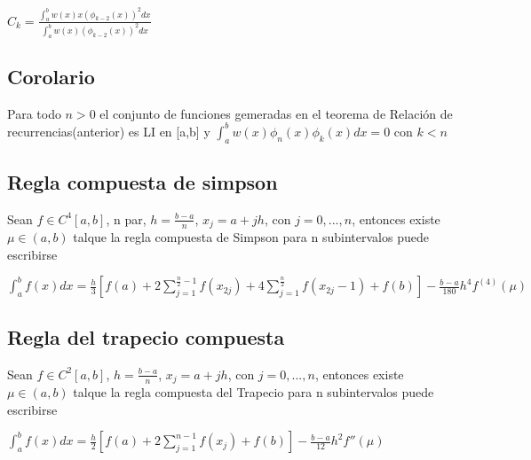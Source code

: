 \documentclass{article}
\begin{document}
$C_k = \frac{\displaystyle\int_{a}^{b}w(x)x(\phi_{k-2}(x))^2dx}{\displaystyle\int_{a}^{b}w(x)(\phi_{k-2}(x))^2dx}$


 \vspace{5mm}


 \subsection{Corolario}\label{Metodo-Newton-Global}

Para todo $n > 0$ el conjunto de funciones gemeradas en el teorema de Relación de recurrencias(anterior) es LI en [a,b]
y $\displaystyle\int_{a}^{b}w(x)\phi_n(x)\phi_k(x)dx = 0$ con $k < n$


 \vspace{5mm}

\subsection{Regla compuesta de simpson}\label{Simpson}

Sean $f \in C^4[a,b]$, n par, $h = \frac{b-a}{n}$, $x_j = a+jh$, con $j=0,...,n$, entonces existe $\mu \in (a,b)$
talque la regla compuesta de Simpson para n subintervalos puede escribirse

 \vspace{5mm}

 $\displaystyle\int_{a}^{b}f(x)dx = \frac{h}{3} \left[ f(a) + 2 \sum\limits_{j=1}^{\frac{n}{2}-1}f(x_{2j})
 +4\sum\limits_{j=1}^{\frac{n}{2}}f(x_{2j}-1)+f(b) \right] - \frac{b-a}{180}h^4f^{(4)}(\mu)$


 \vspace{5mm}

 \subsection{Regla del trapecio compuesta}\label{Trapecio}

Sean $f \in C^2[a,b]$, $h = \frac{b-a}{n}$, $x_j = a+jh$, con $j=0,...,n$, entonces existe $\mu \in (a,b)$
talque la regla compuesta del Trapecio para n subintervalos puede escribirse

 \vspace{5mm}

$\displaystyle\int_{a}^{b}f(x)dx = \frac{h}{2} \left[ f(a) + 2 \sum\limits_{j=1}^{n-1}f(x_{j})
 +f(b) \right] - \frac{b-a}{12}h^2f''(\mu)$

\vspace{5mm}
\end{document}
